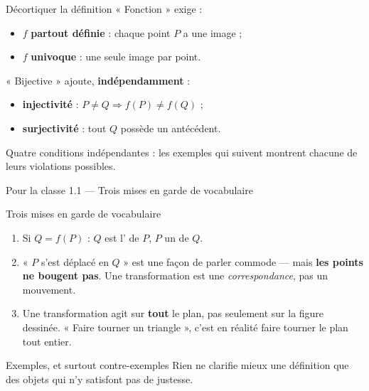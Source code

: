 \begin{frame}{Décortiquer la définition}
  « Fonction » exige :
  \begin{itemize}
    \item[(i)] $f$ \textbf{partout définie} : chaque point $P$ a une image ;
    \item[(ii)] $f$ \textbf{univoque} : une seule image par point.
  \end{itemize}
  « Bijective » ajoute, \textbf{indépendamment} :
  \begin{itemize}
    \item[(iii)] \textbf{injectivité} : $P \neq Q \Rightarrow f(P) \neq f(Q)$ ;
    \item[(iv)] \textbf{surjectivité} : tout $Q$ possède un antécédent.
  \end{itemize}
  \vspace{6pt}
  \small Quatre conditions indépendantes : les exemples qui suivent
  montrent chacune de leurs violations possibles.
\end{frame}

\begin{frame}{Pour la classe 1.1 --- Trois mises en garde de vocabulaire}
  \begin{Classe}{Trois mises en garde de vocabulaire}
    \begin{enumerate}
      \item Si $Q = f(P)$ : $Q$ est l' de $P$, $P$ un
         de $Q$.
      \item « $P$ s'est déplacé en $Q$ » est une façon de parler
        commode --- mais \textbf{les points ne bougent pas}. Une
        transformation est une \emph{correspondance}, pas un
        mouvement.
      \item Une transformation agit sur \textbf{tout} le plan, pas
        seulement sur la figure dessinée. « Faire tourner un
        triangle », c'est en réalité faire tourner le plan tout
        entier.
    \end{enumerate}
  \end{Classe}
\end{frame}

\begin{frame}{Exemples, et surtout contre-exemples}
  \small Rien ne clarifie mieux une définition que des objets qui n'y
  satisfont pas de justesse.
\end{frame}

